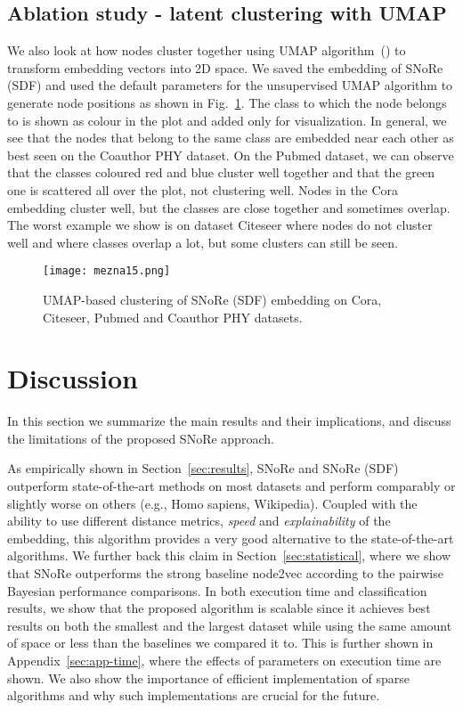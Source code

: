 \documentclass[twoside,11pt]{article}
\begin{document}
\subsection{Ablation study - latent clustering with UMAP}
\label{sec:umap}
We also look at how nodes cluster together using UMAP algorithm~(\cite{lel2018umap}) to transform embedding vectors into 2D space. We saved the embedding of SNoRe (SDF) and used the default parameters for the unsupervised UMAP algorithm to generate node positions as shown in Fig.~\ref{fig:umap}. The class to which the node belongs to is shown as colour in the plot and added only for visualization. In general, we see that the nodes that belong to the same class are embedded near each other as best seen on the Coauthor PHY dataset. On the Pubmed dataset, we can observe that the classes coloured red and blue cluster well together and that the green one is scattered all over the plot, not clustering well. Nodes in the Cora embedding cluster well, but the classes are close together and sometimes overlap. The worst example we show is on dataset Citeseer where nodes do not cluster well and where classes overlap a lot, but some clusters can still be seen.

\begin{figure}[t!]
  \centering
  \texttt{[image: mezna15.png]}
  \caption{UMAP-based clustering of SNoRe (SDF) embedding on Cora, Citeseer, Pubmed and Coauthor PHY datasets.}
  \label{fig:umap}
\end{figure}

\section{Discussion}
\label{sec:discussion}
In this section we summarize the main results and their implications, and discuss the limitations of the proposed SNoRe approach.

As empirically shown in Section~\ref{sec:results}, SNoRe and SNoRe (SDF) outperform state-of-the-art methods on most datasets and perform comparably or slightly worse on others (e.g., Homo sapiens, Wikipedia). Coupled with the ability to use different distance metrics, \emph{speed} and \emph{explainability} of the embedding, this algorithm provides a very good alternative to the state-of-the-art algorithms. We further back this claim in Section~\ref{sec:statistical}, where we show that SNoRe outperforms the strong baseline node2vec according to the pairwise Bayesian performance comparisons.
In both execution time and classification results, we show that the proposed algorithm is scalable since it achieves best results on both the smallest and the largest dataset while using the same amount of space or less than the baselines we compared it to. This is further shown in Appendix~\ref{sec:app-time}, where the effects of parameters on execution time are shown. We also show the importance of efficient implementation of sparse algorithms and why such implementations are crucial for the future.
\end{document}
